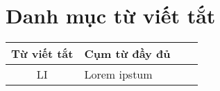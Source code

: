 \chapter*{Danh mục từ viết tắt}
\begin{longtable}{SlSl}
	\textbf{Từ viết tắt} & \textbf{Cụm từ đầy đủ}\\ \hline
	LI & Lorem ipstum\\
\end{longtable}
